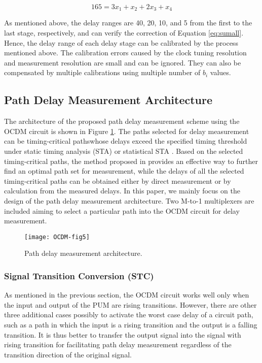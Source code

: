 \begin{equation} \label{eq:sumall}
    165=3x_{1} + x_{2} + 2x_{3} + x_{4}
\end{equation}

As mentioned above, the delay ranges are 40, 20, 10, and 5 from the first to the last stage, respectively, and can verify the correction of Equation \ref{eq:sumall}. Hence, the delay range of each delay stage can be calibrated by the process mentioned above. The calibration errors caused by the clock tuning resolution and measurement resolution are small and can be ignored. They can also be compensated by multiple calibrations using multiple number of $b_{i}$ values.

\subsection{Path Delay Measurement Architecture}
The architecture of the proposed path delay measurement scheme using the OCDM circuit is shown in Figure \ref{fig:OCDM-fig5}. The paths selected for delay measurement can be timing-critical pathswhose delays exceed the specified timing threshold under static timing analysis (STA) or statistical STA \cite{he2010fast} \cite{fu2010testable}. Based on the selected timing-critical paths, the method proposed in \cite{lesser1980experimental} provides an effective way to further find an optimal path set for measurement, while the delays of all the selected timing-critical paths can be obtained either by direct measurement or by calculation from the measured delays. In this paper, we mainly focus on the design of the path delay measurement architecture. Two M-to-1 multiplexers are included aiming to select a particular path into the OCDM circuit for delay measurement.

\begin{figure}[t]
\centering
\texttt{[image: OCDM-fig5]}
   \caption{Path delay measurement architecture.}
    \label{fig:OCDM-fig5}
\end{figure}


\subsubsection{Signal Transition Conversion (STC)}
As mentioned in the previous section, the OCDM circuit works well only when the input and output of the PUM are rising transitions. However, there are other three additional cases possibly to activate the worst case delay of a circuit path, such as a path in which the input is a rising transition and the output is a falling transition. It is thus better to transfer the output signal into the signal with rising transition for facilitating path delay measurement regardless of the transition direction of the original signal.


